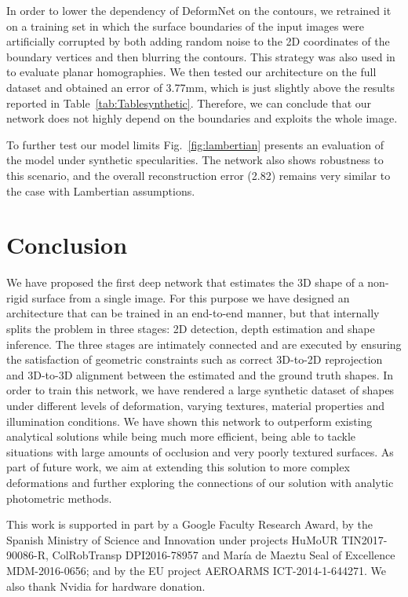\documentclass[10pt,twocolumn,letterpaper]{article}
\begin{document}
\vspace{1mm}
 In order to lower the dependency of DeformNet on the contours, we retrained it on a training set in which the surface boundaries of the input images were artificially corrupted by both adding random noise to the 2D coordinates of the boundary vertices and then blurring the contours. This strategy was also used   in~\cite{liberknecht2009dataset} to evaluate planar homographies.  We then tested our architecture on the full dataset and obtained an error of 3.77mm, which is just slightly above the results reported in Table~\ref{tab:Tablesynthetic}. Therefore, we can conclude that our network does not highly depend on the boundaries and exploits the whole image. 


\vspace{1mm}
 To further test our model limits Fig.~\ref{fig:lambertian} presents an evaluation of the model under synthetic specularities. The network also shows robustness to this scenario, and the overall reconstruction error (2.82) remains very similar to the case with Lambertian assumptions. 

\section{Conclusion}
We have proposed the first deep network that estimates the 3D shape of a non-rigid surface from a single image. For this purpose we have designed an architecture that can be trained in an end-to-end manner, but that internally splits the problem in three stages: 2D detection, depth estimation and shape inference. The three stages are intimately connected and are executed by ensuring the satisfaction of geometric constraints such as correct 3D-to-2D reprojection and 3D-to-3D alignment between the estimated and the ground truth shapes. In order to train this network, we have rendered a large synthetic dataset of shapes under different levels of deformation, varying textures, material properties and illumination conditions. We have shown this network to outperform existing analytical solutions while being much more efficient, being able to tackle situations with large amounts of occlusion and very poorly textured surfaces. As part of future work, we aim at extending this solution to more complex deformations and further exploring the connections of our solution with analytic photometric methods. 
 
\vspace{1mm} 
 This work is supported in part by a Google Faculty Research Award, by the Spanish Ministry of Science and Innovation under projects HuMoUR TIN2017-90086-R, ColRobTransp DPI2016-78957 and  Mar\'ia de Maeztu Seal of Excellence MDM-2016-0656; and by the EU project AEROARMS ICT-2014-1-644271. We also thank Nvidia for hardware donation. 


\balance{\small


}
\end{document}
